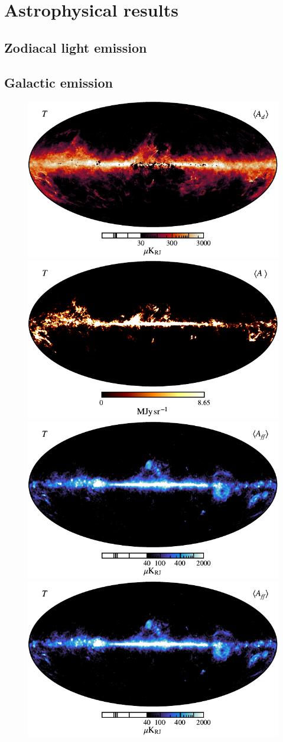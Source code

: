 \documentclass{aa}
\begin{document}
\clearpage
\section{Astrophysical results}
\subsection{Zodiacal light emission}
\subsection{Galactic emission}

\begin{figure}
	\centering
	\includegraphics[width=0.49\linewidth]{figs/CG_dust_v05_I_MEAN_w12_n2048_cb_c-sunburst.pdf}
        \includegraphics[width=0.49\linewidth]{figs/CG_CO_tot_v05_I_MEAN_w12_n1024_cb_c-afmhot.pdf}\\
        \includegraphics[width=0.49\linewidth]{figs/CG_freefree_v05_I_MEAN_w12_n1024_cb_c-freeze.pdf}
        \includegraphics[width=0.49\linewidth]{figs/CG_freefree_v05_I_MEAN_w12_n1024_cb_c-freeze.pdf} %
	\caption{}
	\label{fig:fg_amp}
\end{figure}
\end{document}
